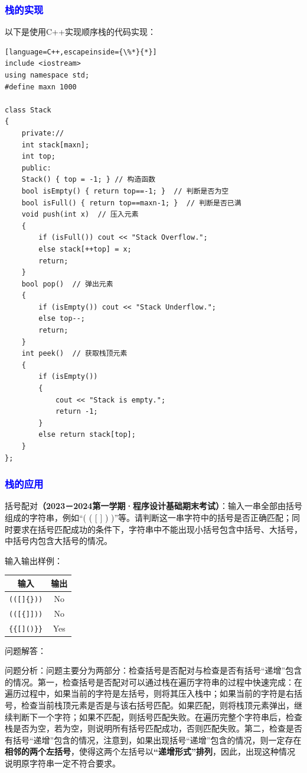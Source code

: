\documentclass[UTF8]{ctexart}
\begin{document}
\subsubsection{\textcolor{blue}{栈的实现}}
以下是使用C++实现顺序栈的代码实现：
\begin{lstlisting}[language=C++,escapeinside={\%*}{*}]
include <iostream>
using namespace std;
#define maxn 1000

class Stack
{
	private://
	int stack[maxn];
	int top;
	public:
	Stack() { top = -1; } // 构造函数
	bool isEmpty() { return top==-1; }  // 判断是否为空
	bool isFull() { return top==maxn-1; }  // 判断是否已满
	void push(int x)  // 压入元素
	{
		if (isFull()) cout << "Stack Overflow.";
		else stack[++top] = x;
		return;
	}
	bool pop()  // 弹出元素
	{
		if (isEmpty()) cout << "Stack Underflow.";
		else top--;
		return;
	}
	int peek()  // 获取栈顶元素
	{
		if (isEmpty())
		{
			cout << "Stack is empty.";
			return -1;
		}
		else return stack[top];
	}
};
\end{lstlisting}
\subsubsection{\textcolor{blue}{栈的应用}}
括号配对\textbf{（2023－2024第一学期·程序设计基础期末考试）}：输入一串全部由括号组成的字符串，例如“( ( [ ] { } ) )”等。请判断这一串字符中的括号是否正确匹配；同时要求在括号匹配成功的条件下，字符串中不能出现小括号包含中括号、大括号，中括号内包含大括号的情况。

输入输出样例：

\begin{tabular}{|c|c|}
	\hline
	输入 & 输出 \\
	\hline
	\verb|(([]{}))| & No \\
	\verb|(([{]]))| & No \\
	\verb|{{[]()}}| & Yes \\
	\hline
\end{tabular}

问题解答：

问题分析：问题主要分为两部分：检查括号是否配对与检查是否有括号“递增”包含的情况。第一，检查括号是否配对可以通过栈在遍历字符串的过程中快速完成：在遍历过程中，如果当前的字符是左括号，则将其压入栈中；如果当前的字符是右括号，检查当前栈顶元素是否是与该右括号匹配。如果匹配，则将栈顶元素弹出，继续判断下一个字符；如果不匹配，则括号匹配失败。在遍历完整个字符串后，检查栈是否为空，若为空，则说明所有括号匹配成功，否则匹配失败。第二，检查是否有括号“递增”包含的情况，注意到，如果出现括号“递增”包含的情况，则一定存在\textbf{相邻的两个左括号}，使得这两个左括号以\textbf{“递增形式”排列}，因此，出现这种情况说明原字符串一定不符合要求。
\end{document}
